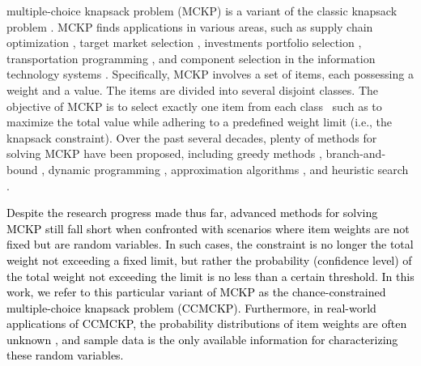 \documentclass[lettersize,journal]{IEEEtran}
\begin{document}
 multiple-choice knapsack problem (MCKP) is a variant of the classic knapsack problem \cite{sinha1979multiple}.
MCKP finds applications in various areas, such as supply chain optimization \cite{sharkey2011class}, target market selection \cite{taaffe2008target}, investments portfolio selection \cite{nauss19780}, transportation programming \cite{zhong2010multiple}, and component selection in the information technology systems \cite{kwong2010optimization}.
Specifically, MCKP involves a set of items, each possessing a weight and a value. 
The items are divided into several disjoint classes.
The objective of MCKP is to select exactly one item from each class~\cite{sinha1979multiple,kellerer2004multiple} such as to maximize the total value while adhering to a predefined weight limit (i.e., the knapsack constraint).
Over the past several decades, plenty of methods for solving MCKP have been proposed, including greedy methods \cite{zemel1980linear}, branch-and-bound \cite{dyer1984branch}, dynamic programming \cite{dudzinski1987exact}, approximation algorithms \cite{gens1998approximate}, and heuristic search \cite{hifi2006reactive}.

\textcolor{black}{
Despite the research progress made thus far, advanced methods for solving MCKP still fall short when confronted with scenarios where item weights are not fixed but are random variables.
In such cases, the constraint is no longer the total weight not exceeding a fixed limit, but rather the probability (confidence level) of the total weight not exceeding the limit is no less than a certain threshold.
In this work, we refer to this particular variant of MCKP as the chance-constrained multiple-choice knapsack problem (CCMCKP).
Furthermore, in real-world applications of CCMCKP, the probability distributions of item weights are often unknown \cite{ji2021data,xie2021distributionally}, and sample data is the only available information for characterizing these random variables.}

\end{document}

